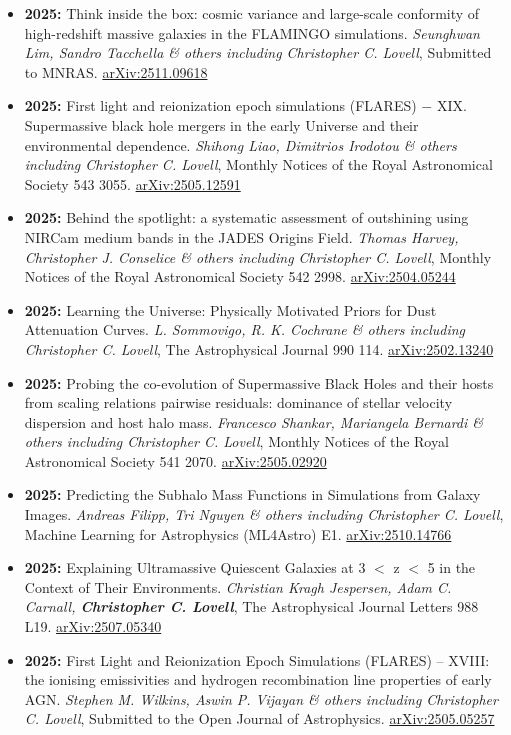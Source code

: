 \begin{itemize}
\item \textbf{2025:} Think inside the box: cosmic variance and large-scale conformity of high-redshift massive galaxies in the FLAMINGO simulations. \textit{Seunghwan Lim, Sandro Tacchella \& others including Christopher C. Lovell}, Submitted to MNRAS. \href{https://arxiv.org/abs/2511.09618}{arXiv:2511.09618}
\item \textbf{2025:} First light and reionization epoch simulations (FLARES) $-$ XIX. Supermassive black hole mergers in the early Universe and their environmental dependence. \textit{Shihong Liao, Dimitrios Irodotou \& others including Christopher C. Lovell}, Monthly Notices of the Royal Astronomical Society 543 3055. \href{https://arxiv.org/abs/2505.12591}{arXiv:2505.12591}
\item \textbf{2025:} Behind the spotlight: a systematic assessment of outshining using NIRCam medium bands in the JADES Origins Field. \textit{Thomas Harvey, Christopher J. Conselice \& others including Christopher C. Lovell}, Monthly Notices of the Royal Astronomical Society 542 2998. \href{https://arxiv.org/abs/2504.05244}{arXiv:2504.05244}
\item \textbf{2025:} Learning the Universe: Physically Motivated Priors for Dust Attenuation Curves. \textit{L. Sommovigo, R. K. Cochrane \& others including Christopher C. Lovell}, The Astrophysical Journal 990 114. \href{https://arxiv.org/abs/2502.13240}{arXiv:2502.13240}
\item \textbf{2025:} Probing the co-evolution of Supermassive Black Holes and their hosts from scaling relations pairwise residuals: dominance of stellar velocity dispersion and host halo mass. \textit{Francesco Shankar, Mariangela Bernardi \& others including Christopher C. Lovell}, Monthly Notices of the Royal Astronomical Society 541 2070. \href{https://arxiv.org/abs/2505.02920}{arXiv:2505.02920}
\item \textbf{2025:} Predicting the Subhalo Mass Functions in Simulations from Galaxy Images. \textit{Andreas Filipp, Tri Nguyen \& others including Christopher C. Lovell}, Machine Learning for Astrophysics (ML4Astro) E1. \href{https://arxiv.org/abs/2510.14766}{arXiv:2510.14766}
\item \textbf{2025:} Explaining Ultramassive Quiescent Galaxies at 3 $<$ z $<$ 5 in the Context of Their Environments. \textit{Christian Kragh Jespersen, Adam C. Carnall, \textbf{Christopher C. Lovell}}, The Astrophysical Journal Letters 988 L19. \href{https://arxiv.org/abs/2507.05340}{arXiv:2507.05340}
\item \textbf{2025:} First Light and Reionization Epoch Simulations (FLARES) -- XVIII: the ionising emissivities and hydrogen recombination line properties of early AGN. \textit{Stephen M. Wilkins, Aswin P. Vijayan \& others including Christopher C. Lovell}, Submitted to the Open Journal of Astrophysics. \href{https://arxiv.org/abs/2505.05257}{arXiv:2505.05257}

\end{itemize}
